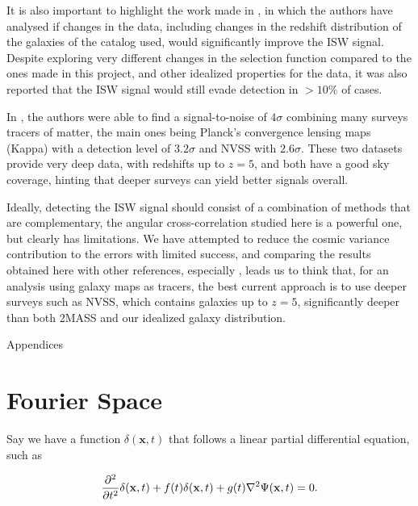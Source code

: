 \documentclass[openany,a4paper,12pt,oneside]{book}
\begin{document}
\begin{spacing}{1.5}
It is also important to highlight the work made in \cite{simillar_ISW_analysis}, in which the authors have analysed if changes in the data, including changes in the redshift distribution of the galaxies of the catalog used, would significantly improve the ISW signal. Despite exploring very different changes in the selection function compared to the ones made in this project, and other idealized properties for the data, it was also reported that the ISW signal would still evade detection in $>10\%$ of cases.

In \cite{cross_corr:Planck}, the authors were able to find a signal-to-noise of $4\sigma$ combining many surveys tracers of matter, the main ones being Planck's convergence lensing maps (Kappa) with a detection level of $3.2\sigma$ and NVSS with $2.6\sigma$. These two datasets provide very deep data, with redshifts up to $z=5$, and both have a good sky coverage, hinting that deeper surveys can yield better signals overall.

Ideally, detecting the ISW signal should consist of a combination of methods that are complementary, the angular cross-correlation studied here is a powerful one, but clearly has limitations. We have attempted to reduce the cosmic variance contribution to the errors with limited success, and comparing the results obtained here with other references, especially \cite{cross_corr:Planck}, leads us to think that, for an analysis using galaxy maps as tracers, the best current approach is to use deeper surveys such as NVSS, which contains galaxies up to $z=5$, significantly deeper than both 2MASS and our idealized galaxy distribution. 

\appendix

\newpage

\begin{center}
\thispagestyle{empty}
\vspace*{\fill}
\Huge{Appendices}
\vspace*{\fill}
\end{center}

\iffalse %
\chapter{Fourier Space}\label{appendix:FourierSpace}

Say we have a function $\delta(\mathbf{x},t)$ that follows a linear partial differential equation, such as

\begin{equation}\label{Four_Space:example_diff_eq}
	\pdv[2]{}{t} \delta(\mathbf{x},t) +f(t)\delta(\mathbf{x},t) + g(t)\nabla^2\Psi(\mathbf{x},t)=0.
\end{equation}


\end{spacing}
\end{document}
